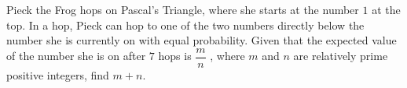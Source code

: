 Pieck the Frog hops on Pascal's Triangle, where she starts at the number $1$ at the top. In a hop, Pieck can hop to one of the two numbers directly below the number she is currently on with equal probability. Given that the expected value of the number she is on after $7$ hops is $\dfrac{m}{n}$ , where $m$ and $n$ are relatively prime positive integers, find $m+n$.
